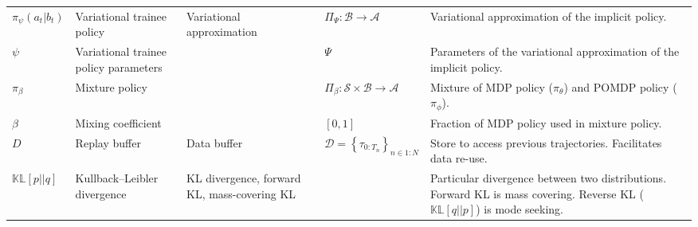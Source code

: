 \begin{minipage}{\textwidth}
\begin{adjustwidth}{-.5in}{-.5in}
\begin{center}
\begin{tabular}{@{}p{2cm}p{2cm}p{2cm}p{3cm}p{6.5cm}@{}}
$\pi_{\psi}(a_t | b_t)$            & Variational trainee policy                 & Variational approximation                               & $\Pi_{\Psi} : \mathcal{B} \rightarrow \mathcal{A}$                                                                                & Variational approximation of the implicit policy.                                                                                                   \\
$\psi$                             & Variational trainee policy parameters      &                                                                 & $\Psi$                                                                                                                            & Parameters of the variational approximation of the implicit policy.                                                                                              \\
$\pi_{\beta}$                      & Mixture policy               &                                                                 & $\Pi_{\beta} : \mathcal{S} \times \mathcal{B} \rightarrow \mathcal{A}$                                                            & Mixture of MDP policy ($\pi_{\theta}$) and POMDP policy ($\pi_{\phi}$).                                                                                                       \\
$\beta$                            & Mixing coefficient           &                                                                 & $\left[ 0, 1 \right]$                                                                                                             & Fraction of MDP policy used in mixture policy.                                                                                                                                \\
$D$                                & Replay buffer                & Data buffer                                                     & $\mathcal{D} = \left\lbrace \tau_{0:T_n} \right\rbrace_{n \in 1:N}$                                                               & Store to access previous trajectories.  Facilitates data re-use.                                                                                                              \\
$\mathbb{KL}\left[ p || q \right]$ & Kullback–Leibler divergence  & KL divergence, forward KL, mass-covering KL                     &                                                                                                                                   & Particular divergence between two distributions.  Forward KL is mass covering.  Reverse KL ($\mathbb{KL} \left[ q || p \right]$) is mode seeking.                             \\

\end{tabular}
\end{center}
\end{adjustwidth}
\end{minipage}
